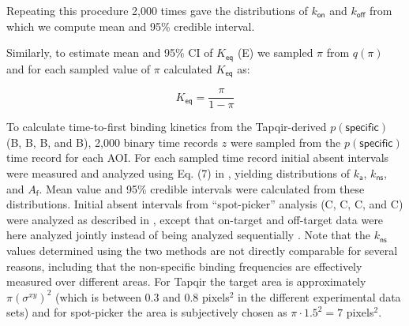 Repeating this procedure 2,000 times gave the distributions of $k_\mathsf{on}$ and $k_\mathsf{off}$ from which we compute mean and 95\% credible interval.

Similarly, to estimate mean and 95\% CI of $K_\mathsf{eq}$ (E) we sampled $\pi$ from $q(\pi)$ and for each sampled value of $\pi$ calculated $K_\mathsf{eq}$ as:

\begin{equation}
    K_\mathsf{eq} = \dfrac{\pi}{1 - \pi}
\end{equation}

To calculate  time-to-first binding kinetics from the Tapqir-derived $p(\mathsf{specific})$ (B, B, B, and B), 2,000 binary time records $z$ were sampled from the $p(\mathsf{specific})$ time record for each AOI. For each sampled time record initial absent intervals were measured and analyzed using Eq. (7) in \cite{Friedman2015-nx}, yielding distributions of $k_\mathsf{a}$, $k_\mathsf{ns}$, and $A_\mathsf{f}$. Mean value and 95\% credible intervals were calculated from these distributions. Initial absent intervals from ``spot-picker'' analysis (C, C, C, and C) were analyzed as described in \citep{Friedman2015-nx}, except that on-target and off-target data were here analyzed jointly instead of being analyzed sequentially \citep{Friedman2015-nx}.  Note that the $k_\mathsf{ns}$ values determined using the two methods are not directly comparable for several reasons, including that the non-specific binding frequencies are effectively measured over different areas. For Tapqir the target area is approximately $ \pi \left( \sigma^{xy} \right) ^2$ (which is between 0.3 and 0.8 pixels$^2$ in the different experimental data sets) and for spot-picker the area is subjectively chosen as $\pi \cdot 1.5^2 = 7$ pixels$^2$.





